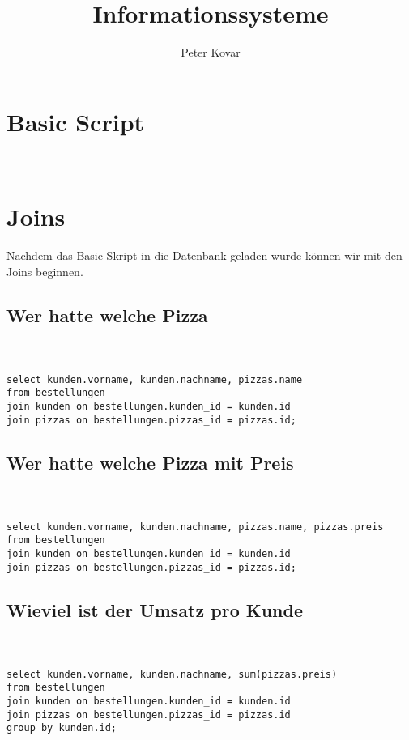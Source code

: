 \documentclass[12pt]{amsart}
\title{Informationssysteme}
\author{Peter Kovar}
\date{} %
\begin{document}
\maketitle
\tableofcontents

\section{Basic Script}


\section{\\Joins}
Nachdem das Basic-Skript in die Datenbank geladen wurde k\"onnen wir mit den Joins beginnen.
\subsection{Wer hatte welche Pizza}
\texttt{\\ \\select kunden.vorname, kunden.nachname, pizzas.name}
\texttt{\\from bestellungen}
\texttt{\\join kunden on bestellungen.kunden\_id  = kunden.id}
\texttt{\\join pizzas on bestellungen.pizzas\_id  = pizzas.id;}

\subsection{Wer hatte welche Pizza mit Preis}
\texttt{\\ \\select kunden.vorname, kunden.nachname, pizzas.name, pizzas.preis}
\texttt{\\from bestellungen}
\texttt{\\join kunden on bestellungen.kunden\_id  = kunden.id}
\texttt{\\join pizzas on bestellungen.pizzas\_id  = pizzas.id;}

\subsection{Wieviel ist der Umsatz pro Kunde}
\texttt{\\ \\select kunden.vorname, kunden.nachname, sum(pizzas.preis)}
\texttt{\\from bestellungen}
\texttt{\\join kunden on bestellungen.kunden\_id  = kunden.id}
\texttt{\\join pizzas on bestellungen.pizzas\_id  = pizzas.id}
\texttt{\\group by kunden.id;}
\end{document}
